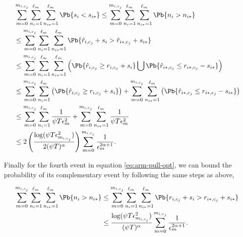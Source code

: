 \begin{customproof}{3}
\begin{align*}
&\sum_{m=0}^{m_{i,c_j}}\sum_{n_i=1}^{\ell_{m_{}}}\sum_{n_{i*}=1}^{\ell_{m_{}}}\Pb\lbrace s_i < s_{i*}\rbrace \leq \sum_{m=0}^{m_{i,c_j}}\sum_{n_i=1}^{\ell_{m_{}}}\sum_{n_{i*}=1}^{\ell_{m_{}}}\Pb\lbrace n_i > n_{i*}\rbrace \\
& \leq \sum_{m=0}^{m_{i,c_j}}\sum_{n_i=1}^{\ell_{m_{}}}\sum_{n_{i*}=1}^{\ell_{m_{}}}\Pb\lbrace \hat{r}_{i,c_j} + s_i > \hat{r}_{i*,c_j} + s_{i*} \rbrace \\
&\leq \sum_{m=0}^{m_{i,c_j}}\sum_{n_i=1}^{\ell_{m_{}}}\sum_{n_{i*}=1}^{\ell_{m_{}}}\left( \Pb\lbrace \hat{r}_{i,c_j} \geq r_{i,c_j} + s_i \rbrace \bigcup \Pb\lbrace \hat{r}_{i*,c_j} \leq r_{i*,c_j} - s_{i*} \rbrace \right)\\
&\leq \sum_{m=0}^{m_{i,c_j}}\sum_{n_i=1}^{\ell_{m_{}}}\left( \Pb\lbrace \hat{r}_{i,c_j} \geq r_{i,c_j} + s_i \rbrace \right) +  \sum_{m=0}^{m_{i,c_j}}\sum_{n_{i*}=1}^{\ell_{m_{}}}\left( \Pb\lbrace \hat{r}_{i*,c_j} \leq r_{i*,c_j} - s_{i*} \rbrace \right) \\
&\leq \sum_{m=0}^{m_{i,c_j}}\sum_{n_i=1}^{\ell_{m_{}}}\dfrac{1}{\psi T\epsilon_{m_{}}^2} +  \sum_{m=0}^{m_{i,c_j}}\sum_{n_{i*}=1}^{\ell_{m_{}}}\dfrac{1}{\psi T\epsilon_{m_{}}^2} \\
&\leq 2\left(\dfrac{\log(\psi T \epsilon_{m_{i,c_j}}^2)}{2(\psi T)^{\alpha}}\right)\sum_{m=0}^{m_{i,c_j}}\dfrac{1}{\epsilon_{m_{}}^{2\alpha + 1}}.
\end{align*}

Finally for the fourth event in equation \ref{eq:arm-pull-opt}, we can bound the probability of its complementary event by following the same steps as above,

\begin{align*}
\sum_{m=0}^{m_{i,c_j}}\sum_{n_i=1}^{\ell_{m_{}}}\sum_{n_{i*}=1}^{\ell_{m_{}}}\Pb\lbrace n_i > n_{i*}\rbrace &\leq \sum_{m=0}^{m_{i,c_j}}\sum_{n_i=1}^{\ell_{m_{}}}\sum_{n_{i*}=1}^{\ell_{m_{}}}\Pb\lbrace r_{i,c_j} + s_i > r_{i*,c_j} + s_{i*} \rbrace\\
&\leq \dfrac{\log(\psi T \epsilon_{m_{i,c_j}}^2)}{(\psi T)^{\alpha}}\sum_{m=0}^{m_{i,c_j}}\dfrac{1}{\epsilon_{m}^{2\alpha +1}}.
\end{align*}



\end{customproof}
